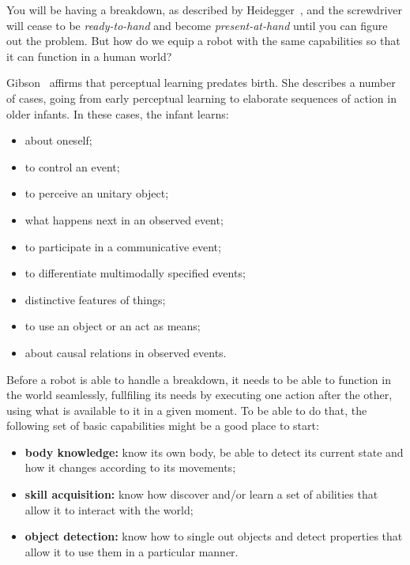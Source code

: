\documentclass{article}
\begin{document}
You will be having a breakdown, as described by Heidegger~\cite{dreyfus07}, and
the screwdriver will cease to be \emph{ready-to-hand} and become
\emph{present-at-hand} until you can figure out the problem. But how do we equip
a robot with the same capabilities so that it can function in a human world?


Gibson~\cite{gibson2000} affirms that perceptual learning predates birth. She
describes a number of cases, going from early perceptual learning to elaborate
sequences of action in older infants. In these cases, the infant learns:

\begin{itemize}
\item about oneself;
\item to control an event;
\item to perceive an unitary object;
\item what happens next in an observed event;
\item to participate in a communicative event;
\item to differentiate multimodally specified events;
\item distinctive features of things;
\item to use an object or an act as means;
\item about causal relations in observed events.
\end{itemize}


Before a robot is able to handle a breakdown, it needs to be able to function in
the world seamlessly, fullfiling its needs by executing one action after the
other, using what is available to it in a given moment. To be able to do that,
the following set of basic capabilities might be a good place to start:

\begin{itemize}
\item \textbf{body knowledge:} know its own body, be able to detect its current
state and how it changes according to its movements;
\item \textbf{skill acquisition:} know how discover and/or learn a set of
abilities that allow it to interact with the world;
\item \textbf{object detection:} know how to single out objects and detect
properties that allow it to use them in a particular manner.
\end{itemize}



\end{document}

